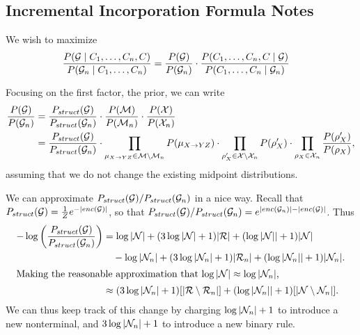 \documentclass{article}
\begin{document}



\subsection{Incremental Incorporation Formula Notes}

We wish to maximize 
\begin{align*}
\frac{P({\mathcal G} \mid C_1, \dots, C_n, C)}{P({\mathcal G}_n\mid C_1, \dots, C_n)}
&= \frac{P({\mathcal G})}{P({\mathcal G}_n)} \cdot 
\frac{P(C_1,\dots,C_n, C\mid {\mathcal G})}{P(C_1,\dots,C_n \mid {\mathcal G}_n)}
\end{align*}

Focusing on the first factor, the prior, we can write
\begin{align*}
\frac{P({\mathcal G})}{P({\mathcal G}_n)} &=
\frac{P_{struct}({\mathcal G})}{P_{struct}({\mathcal G}_n)}
\cdot
\frac{P({\mathcal M})}{P({\mathcal M}_n)}
\cdot
\frac{P({\mathcal X})}{P({\mathcal X}_n)} \\
&= 
\frac{P_{struct}({\mathcal G})}{P_{struct}({\mathcal G}_n)}
\cdot
\prod_{\mu_{X\to YZ}\in {\mathcal M}\setminus {\mathcal M}_n} P(\mu_{X\to YZ})
\cdot
\prod_{\rho'_X \in {\mathcal X} \setminus {\mathcal X}_n} P(\rho'_X)
\cdot 
\prod_{\rho_X \in {\mathcal X}_n} \frac{P(\rho'_X)}{P(\rho_X)},\\
\end{align*}
assuming that we do not change the existing midpoint distributions.

We can approximate $P_{struct}({\mathcal G})/P_{struct}({\mathcal G}_n)$ in a nice
way. Recall that $P_{struct}({\mathcal G}) = \frac{1}{Z} e^{-|enc({\mathcal G})|}$, so
that $P_{struct}({\mathcal G})/P_{struct}({\mathcal G}_n) = e^{ |enc({\mathcal G}_n)| -
  |enc({\mathcal G})|}$. Thus
\begin{align*}
-\log\left(\frac{P_{struct}({\mathcal G})}{P_{struct}({\mathcal G}_n)}\right) &=
\log |{\mathcal N}| + (3 \log |{\mathcal N}| + 1)|{\mathcal R}| + (\log|{\mathcal N}|| + 1)|{\mathcal N}| \\ 
&\quad - \log |{\mathcal N}_n| + (3 \log |{\mathcal N}_n| + 1)|{\mathcal R}_n| + (\log|{\mathcal N}_n|| + 1)|{\mathcal N}_n|. \\ 
\intertext{Making the reasonable approximation that
$\log|{\mathcal N}| \approx \log |{\mathcal N}_n|$,}
&\approx (3 \log |{\mathcal N}_n| + 1)[|{\mathcal R} \setminus {\mathcal R}_n|] + 
(\log|{\mathcal N}_n|| + 1) [|{\mathcal N} \setminus {\mathcal N}_n|]. \\ 
\end{align*}
We can thus keep track of this change by charging $\log|{\mathcal N}_n|+1$ to
introduce a new nonterminal, and $3\log|{\mathcal N}_n|+1$ to introduce a new
binary rule.
\end{document}
